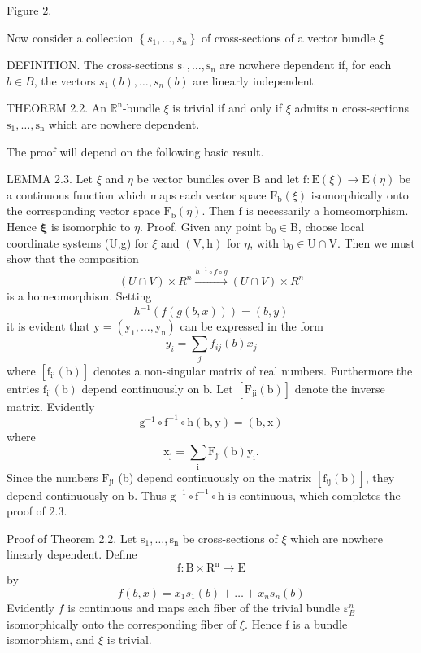 \documentclass[10pt]{article}
\begin{document}
Figure $2 .$

Now consider a collection $\left\{s_{1}, \ldots, s_{n}\right\}$ of cross-sections of a vector bundle $\xi$

DEFINITION. The cross-sections $\mathrm{s}_{1}, \ldots, \mathrm{s}_{\mathrm{n}}$ are nowhere dependent if, for each $b \in B$, the vectors $s_{1}(b), \ldots, s_{n}(b)$ are linearly independent.

THEOREM 2.2. An $\mathbb{R}^{\mathrm{n}}$-bundle $\xi$ is trivial if and only if $\xi$ admits $\mathrm{n}$ cross-sections $\mathrm{s}_{1}, \ldots, \mathrm{s}_{\mathrm{n}}$ which are nowhere dependent.

The proof will depend on the following basic result.

LEMMA 2.3. Let $\xi$ and $\eta$ be vector bundles over $\mathrm{B}$ and let $\mathrm{f}: \mathrm{E}(\xi) \rightarrow \mathrm{E}(\eta)$ be a continuous function which maps each vector space $\mathrm{F}_{\mathrm{b}}(\xi)$ isomorphically onto the corresponding vector space $\mathrm{F}_{\mathrm{b}}(\eta)$. Then $\mathrm{f}$ is necessarily a homeomorphism. Hence $\boldsymbol{\xi}$ is isomorphic to $\eta$. Proof. Given any point $\mathrm{b}_{0} \in \mathrm{B}$, choose local coordinate systems (U,g) for $\xi$ and $(\mathrm{V}, \mathrm{h})$ for $\eta$, with $\mathrm{b}_{0} \in \mathrm{U} \cap \mathrm{V}$. Then we must show that the composition
$$
(U \cap V) \times R^{n} \stackrel{h^{-1} \circ f \circ g}{\longrightarrow}(U \cap V) \times R^{n}
$$
is a homeomorphism. Setting
$$
h^{-1}(f(g(b, x)))=(b, y)
$$
it is evident that $\mathrm{y}=\left(\mathrm{y}_{1}, \ldots, \mathrm{y}_{\mathrm{n}}\right)$ can be expressed in the form
$$
y_{i}=\sum_{j} f_{i j}(b) x_{j}
$$
where $\left[\mathrm{f}_{\mathrm{ij}}(\mathrm{b})\right]$ denotes a non-singular matrix of real numbers. Furthermore the entries $\mathrm{f}_{\mathrm{ij}}(\mathrm{b})$ depend continuously on $\mathrm{b}$. Let $\left[\mathrm{F}_{\mathrm{ji}}(\mathrm{b})\right]$ denote the inverse matrix. Evidently
$$
\mathrm{g}^{-1} \circ \mathrm{f}^{-1} \circ \mathrm{h}(\mathrm{b}, \mathrm{y})=(\mathrm{b}, \mathrm{x})
$$
where
$$
\mathrm{x}_{\mathrm{j}}=\sum_{\mathrm{i}} \mathrm{F}_{\mathrm{ji}}(\mathrm{b}) \mathrm{y}_{\mathrm{i}} .
$$
Since the numbers $\mathrm{F}_{\mathrm{ji}}$ (b) depend continuously on the matrix $\left[\mathrm{f}_{\mathrm{ij}}(\mathrm{b})\right]$, they depend continuously on b. Thus $\mathrm{g}^{-1} \circ \mathrm{f}^{-1} \circ \mathrm{h}$ is continuous, which completes the proof of $2.3 .$

Proof of Theorem 2.2. Let $\mathrm{s}_{1}, \ldots, \mathrm{s}_{\mathrm{n}}$ be cross-sections of $\xi$ which are nowhere linearly dependent. Define
$$
\mathrm{f}: \mathrm{B} \times \mathrm{R}^{\mathrm{n}} \rightarrow \mathrm{E}
$$
by
$$
f(b, x)=x_{1} s_{1}(b)+\ldots+x_{n} s_{n}(b)
$$
Evidently $f$ is continuous and maps each fiber of the trivial bundle $\varepsilon_{B}^{n}$ isomorphically onto the corresponding fiber of $\xi$. Hence $\mathrm{f}$ is a bundle isomorphism, and $\xi$ is trivial.
\end{document}
